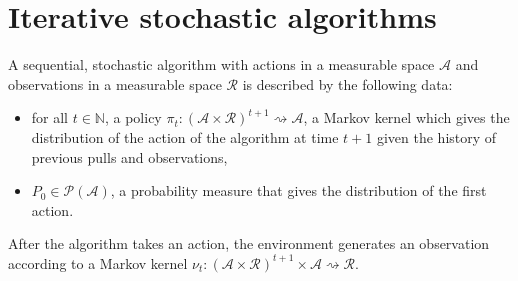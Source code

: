 \chapter{Iterative stochastic algorithms}


\begin{definition}[Algorithm]\label{def:algorithm'}
  \leanok
A sequential, stochastic algorithm with actions in a measurable space $\mathcal{A}$ and observations in a measurable space $\mathcal{R}$ is described by the following data:
\begin{itemize}
  \item for all $t \in \mathbb{N}$, a policy $\pi_t : (\mathcal{A} \times \mathcal{R})^{t+1} \rightsquigarrow \mathcal{A}$, a Markov kernel which gives the distribution of the action of the algorithm at time $t+1$ given the history of previous pulls and observations,
  \item $P_0 \in \mathcal{P}(\mathcal{A})$, a probability measure that gives the distribution of the first action.
\end{itemize}
\end{definition}

After the algorithm takes an action, the environment generates an observation according to a Markov kernel $\nu_t : (\mathcal{A} \times \mathcal{R})^{t+1} \times \mathcal{A} \rightsquigarrow \mathcal{R}$.

